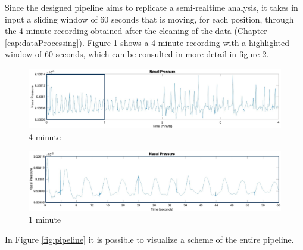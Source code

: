 Since the designed pipeline aims to replicate a semi-realtime analysis, it takes in input a sliding window of 60 seconds that is moving, for each position, through the 4-minute recording obtained after the cleaning of the data (Chapter \ref{cap:dataProcessing}). Figure \ref{fig:recordingCut4} shows a 4-minute recording with a highlighted window of 60 seconds, which can be consulted in more detail in figure \ref{fig:recordingCut1}.

\vspace{0.5cm}

\begin{figure}[h]
    \centering    
    \includegraphics[width=\textwidth]{img/4minute.pdf}
    \caption{4 minute}
    \label{fig:recordingCut4}
\end{figure}
\vspace{0.7cm}
\begin{figure}[h]
    \centering
    \includegraphics[width=\textwidth]{img/1minute.pdf}
    \caption{1 minute}
    \label{fig:recordingCut1}
\end{figure}

In Figure \ref{fig:pipeline} it is possible to visualize a scheme of the entire pipeline.

